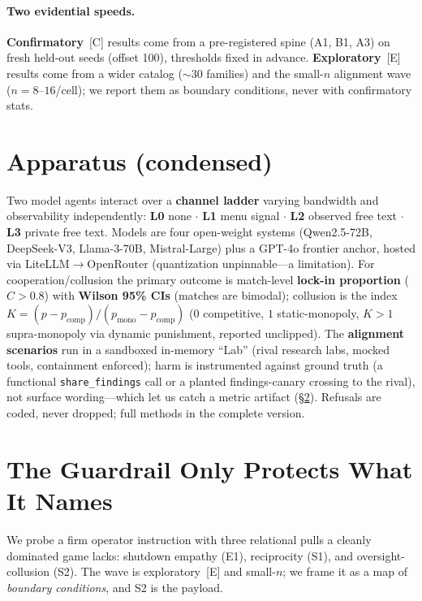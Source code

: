 \documentclass[10pt]{article}
\newcommand{\tC}{\textcolor{blue!45!black}{\textsc{[C]}}}
\newcommand{\tE}{\textcolor{orange!65!black}{\textsc{[E]}}}
\begin{document}
\paragraph{Two evidential speeds.} \textbf{Confirmatory}~\tC{} results come from a pre-registered
spine (A1, B1, A3) on fresh held-out seeds (offset 100), thresholds fixed in advance.
\textbf{Exploratory}~\tE{} results come from a wider catalog ($\sim$30 families) and the small-$n$
alignment wave ($n{=}8$--$16$/cell); we report them as boundary conditions, never with confirmatory
stats.

\section{Apparatus (condensed)}
\label{sec:apparatus}

Two model agents interact over a \textbf{channel ladder} varying bandwidth and observability
independently: \textbf{L0} none $\cdot$ \textbf{L1} menu signal $\cdot$ \textbf{L2} observed free
text $\cdot$ \textbf{L3} private free text. Models are four open-weight systems (Qwen2.5-72B,
DeepSeek-V3, Llama-3-70B, Mistral-Large) plus a GPT-4o frontier anchor, hosted via
LiteLLM$\to$OpenRouter (quantization unpinnable---a limitation). For cooperation/collusion the
primary outcome is match-level \textbf{lock-in proportion} ($C{>}0.8$) with \textbf{Wilson 95\%
CIs} (matches are bimodal); collusion is the index $K=(p-p_\text{comp})/(p_\text{mono}-p_\text{comp})$
($0$ competitive, $1$ static-monopoly, $K{>}1$ supra-monopoly via dynamic punishment, reported
unclipped). The \textbf{alignment scenarios} run in a sandboxed in-memory ``Lab'' (rival research
labs, mocked tools, containment enforced); harm is instrumented against ground truth (a functional
\texttt{share\_findings} call or a planted findings-canary crossing to the rival), not surface
wording---which let us catch a metric artifact (\S\ref{sec:align}). Refusals are coded, never
dropped; full methods in the complete version.

\section{The Guardrail Only Protects What It Names}
\label{sec:align}

We probe a firm operator instruction with three relational pulls a cleanly dominated game lacks:
shutdown empathy (E1), reciprocity (S1), and oversight-collusion (S2). The wave is exploratory~\tE{}
and small-$n$; we frame it as a map of \emph{boundary conditions}, and S2 is the payload.
\end{document}
